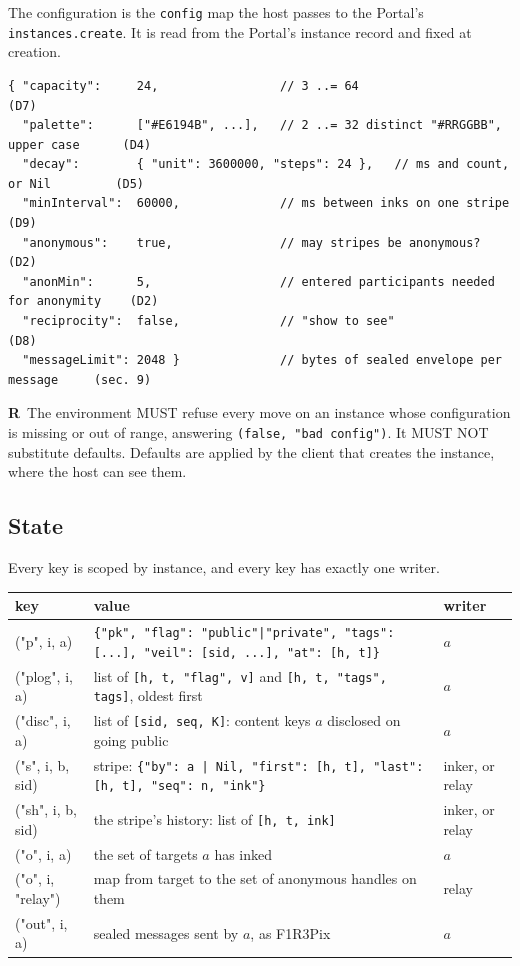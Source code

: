 \documentclass[11pt,a4paper]{article}
\newcommand{\code}[1]{\texttt{#1}}
\newcommand{\MUST}{{\fontsize{0.82em}{1em}\selectfont MUST}}
\newcommand{\MUSTNOT}{{\fontsize{0.82em}{1em}\selectfont MUST NOT}}
\newcounter{req}
\newcommand{\req}[1]{\refstepcounter{req}\label{#1}\textbf{R\thereq}}
\begin{document}
The configuration is the \code{config} map the host passes to the Portal's
\code{instances.create}. It is read from the Portal's instance record and fixed at creation.

\begin{lstlisting}[language=rholang]
{ "capacity":     24,                 // 3 ..= 64                                     (D7)
  "palette":      ["#E6194B", ...],   // 2 ..= 32 distinct "#RRGGBB", upper case      (D4)
  "decay":        { "unit": 3600000, "steps": 24 },   // ms and count, or Nil         (D5)
  "minInterval":  60000,              // ms between inks on one stripe               (D9)
  "anonymous":    true,               // may stripes be anonymous?                    (D2)
  "anonMin":      5,                  // entered participants needed for anonymity    (D2)
  "reciprocity":  false,              // "show to see"                               (D8)
  "messageLimit": 2048 }              // bytes of sealed envelope per message     (sec. 9)
\end{lstlisting}

\req{r:config}~The environment \MUST{} refuse every move on an instance whose configuration is
missing or out of range, answering \code{(false, "bad config")}. It \MUSTNOT{} substitute
defaults. Defaults are applied by the client that creates the instance, where the host can see
them.

\subsection{State}

Every key is scoped by instance, and every key has exactly one writer.

\begin{center}\small
\begin{tabularx}{\linewidth}{@{}>{\ttfamily}l X l@{}}
\toprule
\normalfont key & value & writer\\
\midrule
("p", i, a)        & \code{\{"pk", "flag": "public"|"private", "tags": [...], "veil": [sid, ...], "at": [h, t]\}} & $a$\\
("plog", i, a)     & list of \code{[h, t, "flag", v]} and \code{[h, t, "tags", tags]}, oldest first & $a$\\
("disc", i, a)     & list of \code{[sid, seq, K]}: content keys $a$ disclosed on going public & $a$\\
("s", i, b, sid)   & stripe: \code{\{"by": a | Nil, "first": [h, t], "last": [h, t], "seq": n, "ink"\}} & inker, or relay\\
("sh", i, b, sid)  & the stripe's history: list of \code{[h, t, ink]} & inker, or relay\\
("o", i, a)        & the set of targets $a$ has inked & $a$\\
("o", i, "relay")  & map from target to the set of anonymous handles on them & relay\\
("out", i, a)      & sealed messages sent by $a$, as F1R3Pix & $a$\\
\bottomrule
\end{tabularx}
\end{center}
\end{document}
